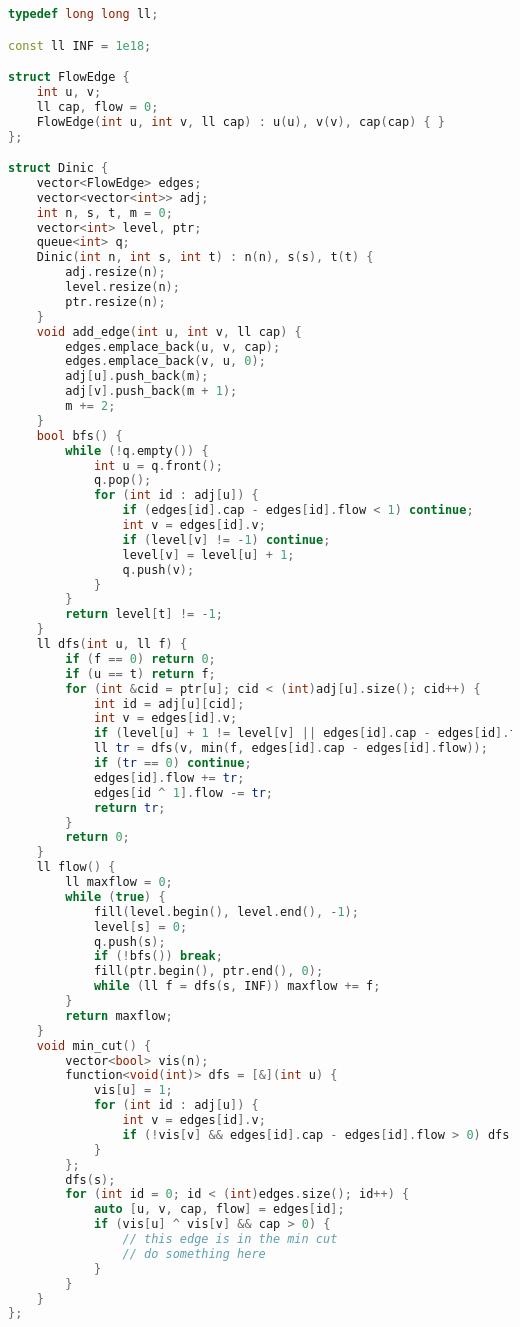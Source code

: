 \documentclass[10pt, a4paper, oneside]{book}
\begin{document}
\begin{lstlisting}[language=C++]
typedef long long ll;

const ll INF = 1e18;

struct FlowEdge {
    int u, v;
    ll cap, flow = 0;
    FlowEdge(int u, int v, ll cap) : u(u), v(v), cap(cap) { }
};

struct Dinic {
    vector<FlowEdge> edges;
    vector<vector<int>> adj;
    int n, s, t, m = 0;
    vector<int> level, ptr;
    queue<int> q;
    Dinic(int n, int s, int t) : n(n), s(s), t(t) {
        adj.resize(n);
        level.resize(n);
        ptr.resize(n);
    }
    void add_edge(int u, int v, ll cap) {
        edges.emplace_back(u, v, cap);
        edges.emplace_back(v, u, 0);
        adj[u].push_back(m);
        adj[v].push_back(m + 1);
        m += 2;
    }
    bool bfs() {
        while (!q.empty()) {
            int u = q.front();
            q.pop();
            for (int id : adj[u]) {
                if (edges[id].cap - edges[id].flow < 1) continue;
                int v = edges[id].v;
                if (level[v] != -1) continue;
                level[v] = level[u] + 1;
                q.push(v);
            }
        }
        return level[t] != -1;
    }
    ll dfs(int u, ll f) {
        if (f == 0) return 0;
        if (u == t) return f;
        for (int &cid = ptr[u]; cid < (int)adj[u].size(); cid++) {
            int id = adj[u][cid];
            int v = edges[id].v;
            if (level[u] + 1 != level[v] || edges[id].cap - edges[id].flow < 1) continue;
            ll tr = dfs(v, min(f, edges[id].cap - edges[id].flow));
            if (tr == 0) continue;
            edges[id].flow += tr;
            edges[id ^ 1].flow -= tr;
            return tr;
        }
        return 0;
    }
    ll flow() {
        ll maxflow = 0;
        while (true) {
            fill(level.begin(), level.end(), -1);
            level[s] = 0;
            q.push(s);
            if (!bfs()) break;
            fill(ptr.begin(), ptr.end(), 0);
            while (ll f = dfs(s, INF)) maxflow += f;
        }
        return maxflow;
    }
    void min_cut() {
        vector<bool> vis(n);
        function<void(int)> dfs = [&](int u) {
            vis[u] = 1;
            for (int id : adj[u]) {
                int v = edges[id].v;
                if (!vis[v] && edges[id].cap - edges[id].flow > 0) dfs(v);
            }
        };
        dfs(s);
        for (int id = 0; id < (int)edges.size(); id++) {
            auto [u, v, cap, flow] = edges[id];
            if (vis[u] ^ vis[v] && cap > 0) {
                // this edge is in the min cut
                // do something here
            }
        }
    }
};
\end{lstlisting}
\hfill
\end{document}
